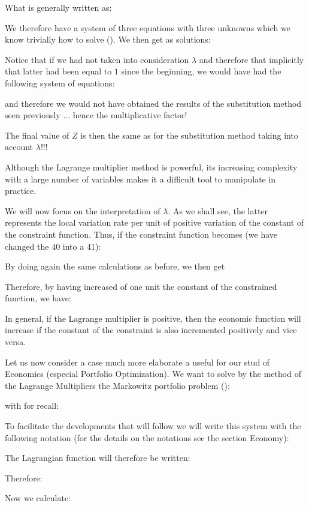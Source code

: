  	What is generally written as:
	
	We therefore have a system of three equations with three unknowns which we know trivially how to solve (). We then get as solutions:
	
 	Notice that if we had not taken into consideration $\lambda$ and therefore that implicitly that latter had been equal to $1$ since the beginning, we would have had the following system of equations:
	
	and therefore we would not have obtained the results of the substitution method seen previously ... hence the multiplicative factor!

	The final value of $Z$ is then the same as for the substitution method taking into account $\lambda$!!!

	Although the Lagrange multiplier method is powerful, its increasing complexity with a large number of variables makes it a difficult tool to manipulate in practice.

	We will now focus on the interpretation of $\lambda$. As we shall see, the latter represents the local variation rate per unit of positive variation of the constant of the constraint function. Thus, if the constraint function becomes (we have changed the $40$ into a $41$):
	
	By doing again the same calculations as before, we then get
	
 	Therefore, by having increased of one unit the constant of the constrained function, we have:
	
 	In general, if the Lagrange multiplier is positive, then the economic function will increase if the constant of the constraint is also incremented positively and vice versa.

	Let us now consider a case much more elaborate a useful for our stud of Economics (especial Portfolio Optimization). We want to solve by the method of the Lagrange Multipliers the Markowitz portfolio problem ():
	
	with for recall:
	
	To facilitate the developments that will follow we will write this system with the following notation (for the details on the notations see the section Economy):
	
	The Lagrangian function will therefore be written:
	 
	Therefore:
	 
 	Now we calculate:
	 
